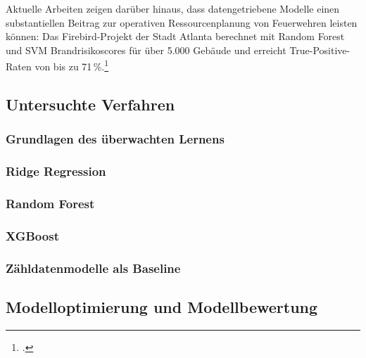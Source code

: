 \documentclass[12pt,a4paper]{article}
\begin{document}
Aktuelle Arbeiten zeigen darüber hinaus, dass datengetriebene Modelle einen substantiellen Beitrag
zur operativen Ressourcenplanung von Feuerwehren leisten können: Das Firebird-Projekt der Stadt
Atlanta berechnet mit Random Forest und SVM Brandrisikoscores für über 5.000 Gebäude und erreicht
True-Positive-Raten von bis zu 71\,\%.\footcite[1-2]{Madaio2016}


\subsection{Untersuchte Verfahren}

\subsubsection{Grundlagen des überwachten Lernens}

\subsubsection{Ridge Regression}

\subsubsection{Random Forest}

\subsubsection{XGBoost}

\subsubsection{Zähldatenmodelle als Baseline}

\subsection{Modelloptimierung und Modellbewertung}
\end{document}
